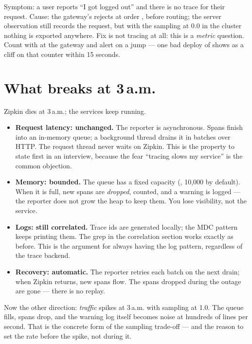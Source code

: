 \begin{pitfall}
Symptom: a user reports ``I got logged out'' and there is no trace for
their request. Cause: the gateway's 
rejects at order , before routing; the server observation
still records the request, but with the sampling at 0.0 in the cluster
nothing is exported anywhere. Fix is not tracing at all: this is a
\emph{metric} question. Count  with
 at the gateway and alert on a jump --- one bad
deploy of  shows as a cliff on that counter within
15 seconds.
\end{pitfall}

\section{What breaks at 3\,a.m.}

Zipkin dies at 3\,a.m.; the services keep running.

\begin{itemize}
  \item \textbf{Request latency: unchanged.} The reporter is
  asynchronous. Spans finish into an in-memory queue; a background
  thread drains it in batches over HTTP. The request thread never waits
  on Zipkin. This is the property to state first in an interview,
  because the fear ``tracing slows my service'' is the common objection.
  \item \textbf{Memory: bounded.} The queue has a fixed capacity
  (, 10{,}000 by default). When it is full, new
  spans are \emph{dropped}, counted, and a warning is logged --- the
  reporter does not grow the heap to keep them. You lose visibility,
  not the service.
  \item \textbf{Logs: still correlated.} Trace ids are generated
  locally; the MDC pattern keeps printing them. The grep in the
  correlation section works exactly as before. This is the argument for
  always having the log pattern, regardless of the trace backend.
  \item \textbf{Recovery: automatic.} The reporter retries each batch on
  the next drain; when Zipkin returns, new spans flow. The spans dropped
  during the outage are gone --- there is no replay.
\end{itemize}

Now the other direction: \emph{traffic} spikes at 3\,a.m. with sampling
at 1.0. The queue fills, spans drop, and the warning log itself becomes
noise at hundreds of lines per second. That is the concrete form of the
sampling trade-off --- and the reason to set the rate before the spike,
not during it.

